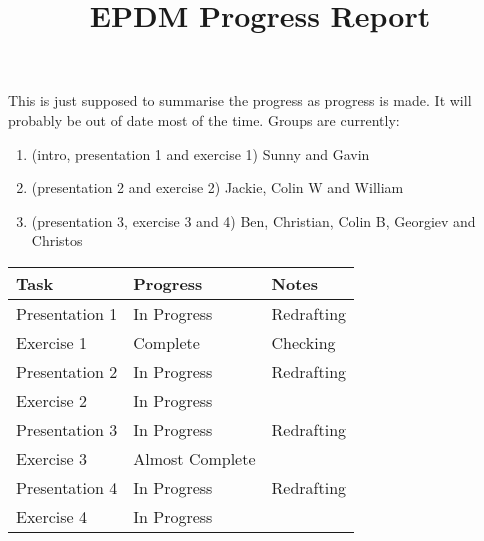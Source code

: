 \documentclass[11pt]{article}
\title{EPDM Progress Report}
\author{}
\begin{document}
\maketitle

This is just supposed to summarise the progress as progress is made.
It will probably be out of date most of the time.
Groups are currently:
\begin{enumerate}
\item (intro, presentation 1 and exercise 1) Sunny and Gavin
\item (presentation 2 and exercise 2) Jackie, Colin W and William
\item (presentation 3, exercise 3 and 4) Ben, Christian, Colin B, Georgiev and Christos
\end{enumerate}


\begin{table}
\begin{center}
\begin{tabular}{l l p{}}
Task & Progress & Notes \\
\hline
Presentation 1 & In Progress & Redrafting \\
Exercise 1 & Complete & Checking \\
Presentation 2 & In Progress & Redrafting \\ 
Exercise 2 & In Progress &  \\
Presentation 3 & In Progress & Redrafting \\
Exercise 3  & Almost Complete & \\
Presentation 4 & In Progress & Redrafting \\
Exercise 4 & In Progress & \\ 
\end{tabular}
\end{center}
\end{table}
\end{document}

